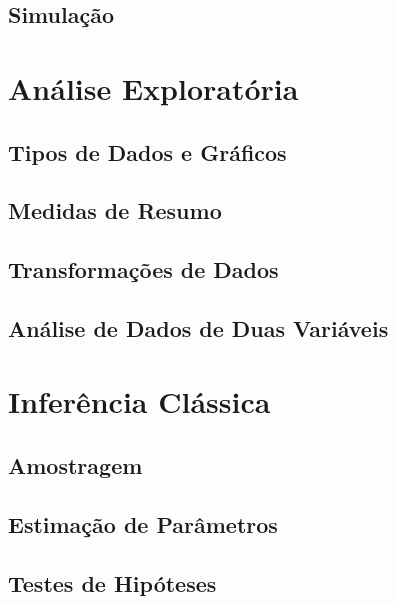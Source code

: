 \documentclass[11pt, openany]{book}
\begin{document}
\chapter{Simulação}

\part{Análise Exploratória}
%
\chapter{Tipos de Dados e Gráficos}






\chapter{Medidas de Resumo}








\chapter{Transformações de Dados}



\chapter{Análise de Dados de Duas Variáveis}


\part{Inferência Clássica}

\chapter{Amostragem}
\chapter{Estimação de Parâmetros}
\chapter{Testes de Hipóteses}
\end{document}
